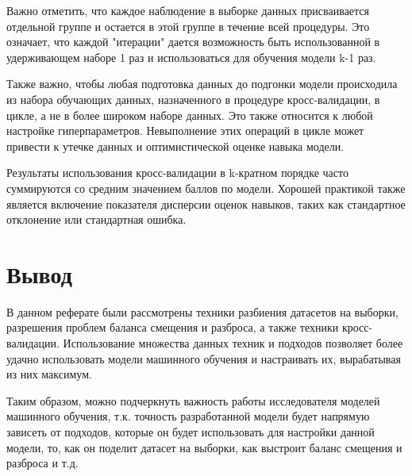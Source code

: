 Важно отметить, что каждое наблюдение в выборке данных присваивается отдельной группе и остается в этой группе в течение всей процедуры. Это означает, что каждой "итерации" дается возможность быть использованной в удерживающем наборе 1 раз и использоваться для обучения модели k-1 раз.

Также важно, чтобы любая подготовка данных до подгонки модели происходила из набора обучающих данных, назначенного в процедуре кросс-валидации, в цикле, а не в более широком наборе данных. Это также относится к любой настройке гиперпараметров. Невыполнение этих операций в цикле может привести к утечке данных и оптимистической оценке навыка модели.

Результаты использования кросс-валидации в k-кратном порядке часто суммируются со средним значением баллов по модели. Хорошей практикой также является включение показателя дисперсии оценок навыков, таких как стандартное отклонение или стандартная ошибка.

\section{Вывод}

В данном реферате были рассмотрены техники разбиения датасетов на выборки, разрешения проблем баланса смещения и разброса, а также техники кросс-валидации. Использование множества данных техник и подходов позволяет более удачно использовать модели машинного обучения и настраивать их, вырабатывая из них максимум.

Таким образом, можно подчеркнуть важность работы исследователя моделей машинного обучения, т.к. точность разработанной модели будет напрямую зависеть от подходов, которые он будет использовать для настройки данной модели, то, как он поделит датасет на выборки, как выстроит баланс смещения и разброса и т.д.




